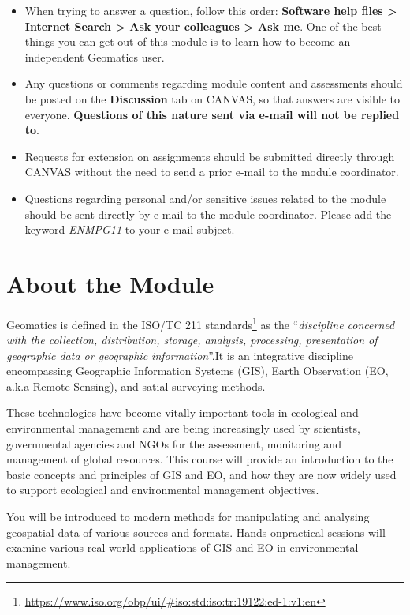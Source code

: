 \documentclass[
]{book}
\renewcommand{\href}[2]{#2\footnote{\url{#1}}}
\begin{document}
\begin{itemize}
\item
  When trying to answer a question, follow this order: \textbf{Software help files \textgreater{} Internet Search \textgreater{} Ask your colleagues \textgreater{} Ask me}. One of the best things you can get out of this module is to learn how to become an independent Geomatics user.
\item
  Any questions or comments regarding module content and assessments should be posted on the \textbf{Discussion} tab on CANVAS, so that answers are visible to everyone. \textbf{Questions of this nature sent via e-mail will not be replied to}.
\item
  Requests for extension on assignments should be submitted directly through CANVAS without the need to send a prior e-mail to the module coordinator.
\item
  Questions regarding personal and/or sensitive issues related to the module should be sent directly by e-mail to the module coordinator. Please add the keyword \emph{ENMPG11} to your e-mail subject.
\end{itemize}

\hypertarget{about-the-module}{%
\section{About the Module}\label{about-the-module}}

Geomatics is defined in the \href{https://www.iso.org/obp/ui/\#iso:std:iso:tr:19122:ed-1:v1:en}{ISO/TC 211 standards} as the ``\emph{discipline concerned with the collection, distribution, storage, analysis, processing, presentation of geographic data or geographic information}''.It is an integrative discipline encompassing Geographic Information Systems (GIS), Earth Observation (EO, a.k.a Remote Sensing), and satial surveying methods.

These technologies have become vitally important tools in ecological and environmental management and are being increasingly used by scientists, governmental agencies and NGOs for the assessment, monitoring and management of global resources. This course will provide an introduction to the basic concepts and principles of GIS and EO, and how they are now widely used to support ecological and environmental management objectives.

You will be introduced to modern methods for manipulating and analysing geospatial data of various sources and formats. Hands-onpractical sessions will examine various real-world applications of GIS and EO in environmental management.
\end{document}
